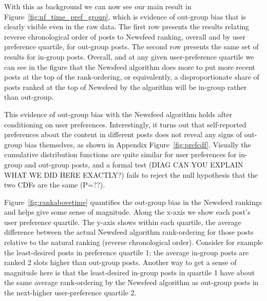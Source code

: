 \documentclass[12pt,letterpaper]{article}
\begin{document}
With this as background we can now see our main result in Figure~\ref{fig:nf_time_pref_group}, which is evidence of out-group bias that is clearly visible even in the raw data. The first row presents the results relating reverse chronological order of posts to Newsfeed ranking, overall and by user preference quartile, for out-group posts. The second row presents the same set of results for in-group posts. Overall, and at any given user-preference quartile we can see in the figure that the Newsfeed algorithm does more to put more recent posts at the top of the rank-ordering, or equivalently, a disproportionate share of posts ranked at the top of Newsfeed by the algorithm will be in-group rather than out-group.

This evidence of out-group bias with the Newsfeed algorithm holds after conditioning on user preferences. Interestingly, it turns out that self-reported preferences about the content in different posts does not reveal any signs of out-group bias themselves, as shown in Appendix Figure~\ref{fig:prefcdf}. Visually the cumulative distribution functions are quite similar for user preferences for in-group and out-group posts, and a formal test (DIAG CAN YOU EXPLAIN WHAT WE DID HERE EXACTLY?) fails to reject the null hypothesis that the two CDFs are the same (P=??).

Figure~\ref{fig:rankabovetime} quantifies the out-group bias in the Newsfeed rankings and helps give some sense of magnitude. Along the x-axis we show each post's user preference quartile. The y-axis shows within each quartile, the average difference between the actual Newsfeed algorithm rank-ordering for those posts relative to the natural ranking (reverse chronological order). Consider for example the least-desired posts in preference quartile 1; the average in-group posts are ranked 2 slots higher than out-group posts. Another way to get a sense of magnitude here is that the least-desired in-group posts in quartile 1 have about the same average rank-ordering by the Newsfeed algorithm as out-group posts in the next-higher user-preference quartile 2.
\end{document}
